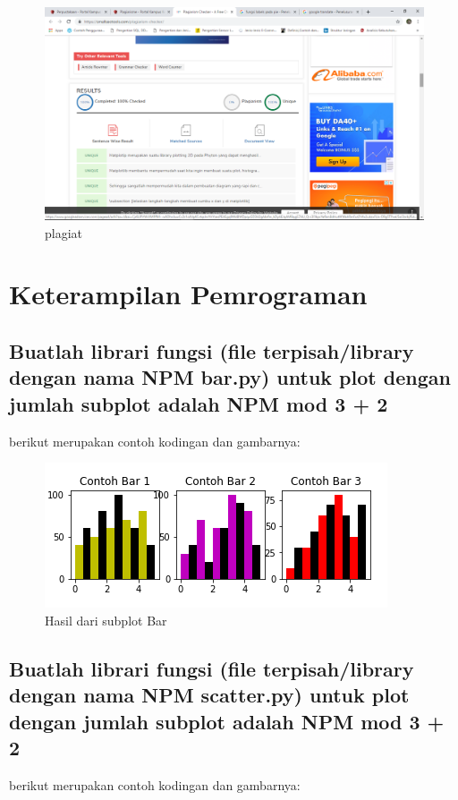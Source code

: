 \begin{figure}[!htbp]
\centering
\includegraphics[scale=0.2]{figures/6/1174012/SSP.PNG}
\caption{plagiat}
\label{plagiat}
\end{figure}
\section{Keterampilan Pemrograman}
\subsection{Buatlah librari fungsi (ﬁle terpisah/library dengan nama NPM bar.py) untuk plot dengan jumlah subplot adalah NPM mod 3 + 2 }
berikut merupakan contoh kodingan dan gambarnya:


\begin{figure}[h]
\centering
\includegraphics[scale=0.9]{figures/6/1174012/bar.png}
\caption{Hasil dari subplot Bar}
\label{fig:contoh}
\end{figure}
\subsection{Buatlah librari fungsi (ﬁle terpisah/library dengan nama NPM scatter.py) untuk plot dengan jumlah subplot adalah NPM mod 3 + 2 }
berikut merupakan contoh kodingan dan gambarnya:


